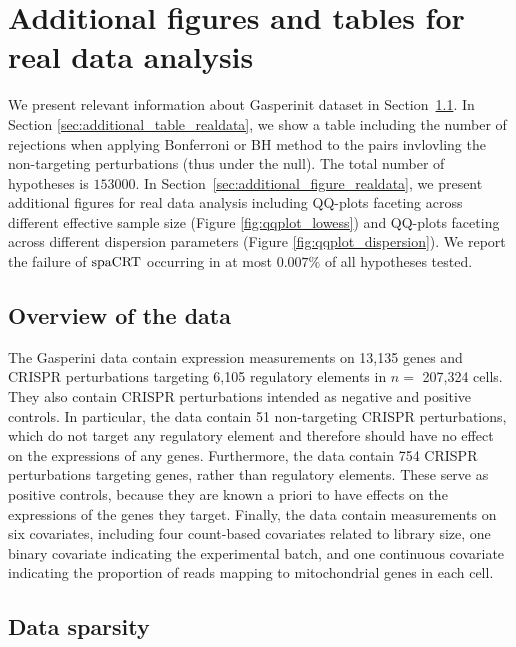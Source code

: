 \documentclass[12pt]{article}
\theoremstyle{definition}
\newcommand{\spacrt}{\textnormal{spaCRT}}               %
\begin{document}
\clearpage


\section{Additional figures and tables for real data analysis}

We present relevant information about Gasperinit dataset in Section~\ref{sec:additional-details-real-data}. In Section \ref{sec:additional_table_realdata}, we show a table including the number of rejections when applying Bonferroni or BH method to the pairs invlovling the non-targeting perturbations (thus under the null). The total number of hypotheses is $153000$. In Section~\ref{sec:additional_figure_realdata}, we present additional figures for real data analysis including QQ-plots faceting across different effective sample size (Figure \ref{fig:qqplot_lowess}) and QQ-plots faceting across different dispersion parameters (Figure \ref{fig:qqplot_dispersion}). We report the failure of $\spacrt$ occurring in at most $0.007 \%$ of all hypotheses tested. 



\subsection{Overview of the data}\label{sec:additional-details-real-data}

The Gasperini data contain expression measurements on 13,135 genes and CRISPR perturbations targeting 6,105 regulatory elements in $n =$ 207,324 cells. They also contain CRISPR perturbations intended as negative and positive controls. In particular, the data contain 51 non-targeting CRISPR perturbations, which do not target any regulatory element and therefore should have no effect on the expressions of any genes. Furthermore, the data contain 754 CRISPR perturbations targeting genes, rather than regulatory elements. These serve as positive controls, because they are known a priori to have effects on the expressions of the genes they target. Finally, the data contain measurements on six covariates, including four count-based covariates related to library size, one binary covariate indicating the experimental batch, and one continuous covariate indicating the proportion of reads mapping to mitochondrial genes in each cell.

\subsection{Data sparsity}\label{sec:sparsity_level_realdata}
\end{document}
